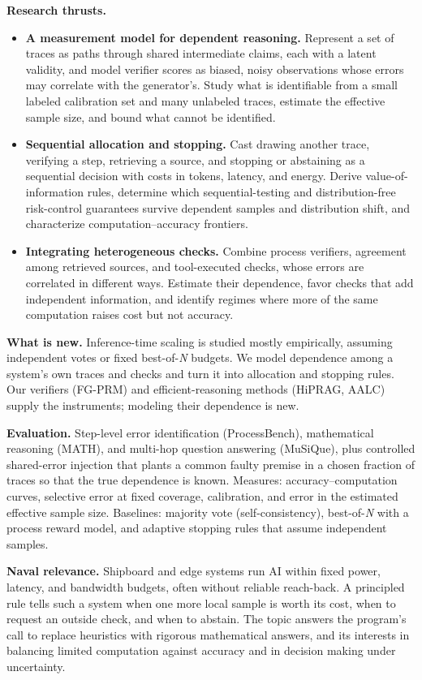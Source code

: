 \documentclass[11pt]{article}
\newcommand{\head}[1]{{\color{navy}\textbf{#1}}\enspace}
\begin{document}
\head{Research thrusts.}
\begin{itemize}
\item \textbf{A measurement model for dependent reasoning.} Represent a set of traces as paths through shared intermediate claims, each with a latent validity, and model verifier scores as biased, noisy observations whose errors may correlate with the generator's. Study what is identifiable from a small labeled calibration set and many unlabeled traces, estimate the effective sample size, and bound what cannot be identified.
\item \textbf{Sequential allocation and stopping.} Cast drawing another trace, verifying a step, retrieving a source, and stopping or abstaining as a sequential decision with costs in tokens, latency, and energy. Derive value-of-information rules, determine which sequential-testing and distribution-free risk-control guarantees survive dependent samples and distribution shift, and characterize computation--accuracy frontiers.
\item \textbf{Integrating heterogeneous checks.} Combine process verifiers, agreement among retrieved sources, and tool-executed checks, whose errors are correlated in different ways. Estimate their dependence, favor checks that add independent information, and identify regimes where more of the same computation raises cost but not accuracy.
\end{itemize}

\head{What is new.} Inference-time scaling is studied mostly empirically, assuming independent votes or fixed best-of-\textit{N} budgets. We model dependence among a system's own traces and checks and turn it into allocation and stopping rules. Our verifiers (FG-PRM) and efficient-reasoning methods (HiPRAG, AALC) supply the instruments; modeling their dependence is new.

\head{Evaluation.} Step-level error identification (ProcessBench), mathematical reasoning (MATH), and multi-hop question answering (MuSiQue), plus controlled shared-error injection that plants a common faulty premise in a chosen fraction of traces so that the true dependence is known. Measures: accuracy--computation curves, selective error at fixed coverage, calibration, and error in the estimated effective sample size. Baselines: majority vote (self-consistency), best-of-\textit{N} with a process reward model, and adaptive stopping rules that assume independent samples.

\head{Naval relevance.} Shipboard and edge systems run AI within fixed power, latency, and bandwidth budgets, often without reliable reach-back. A principled rule tells such a system when one more local sample is worth its cost, when to request an outside check, and when to abstain. The topic answers the program's call to replace heuristics with rigorous mathematical answers, and its interests in balancing limited computation against accuracy and in decision making under uncertainty.
\end{document}
